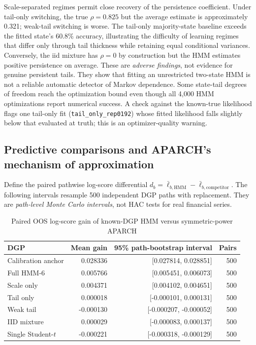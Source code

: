 \documentclass[11pt,a4paper]{article}
\begin{document}
Scale-separated regimes permit close recovery of the persistence coefficient. Under tail-only switching, the true $\rho=0.825$ but the average estimate is approximately 0.321; weak-tail switching is worse. The tail-only majority-state baseline exceeds the fitted state's 60.8\% accuracy, illustrating the difficulty of learning regimes that differ only through tail thickness while retaining equal conditional variances. Conversely, the iid mixture has $\rho=0$ by construction but the HMM estimates positive persistence on average. These are \emph{adverse findings}, not evidence for genuine persistent tails. They show that fitting an unrestricted two-state HMM is not a reliable automatic detector of Markov dependence. Some state-tail degrees of freedom reach the optimization bound even though all 4,000 HMM optimizations report numerical success. A check against the known-true likelihood flags one tail-only fit (\texttt{tail\_only\_rep0192}) whose fitted likelihood falls slightly below that evaluated at truth; this is an optimizer-quality warning.

\subsection{Predictive comparisons and APARCH's mechanism of approximation}
Define the paired pathwise log-score differential $d_b=\bar\ell_{b,\mathrm{HMM}}-\bar\ell_{b,\mathrm{competitor}}$. The following intervals resample 500 independent DGP paths with replacement. They are \emph{path-level Monte Carlo intervals}, not HAC tests for real financial series.
\begin{table}[htbp]\centering\footnotesize
\caption{Paired OOS log-score gain of known-DGP HMM versus symmetric-power APARCH}\label{tab:dgp_paired}
\setlength{\tabcolsep}{5pt}
\begin{tabular}{lrrr}\toprule
DGP & Mean gain & 95\% path-bootstrap interval & Pairs \\\midrule
Calibration anchor & 0.028336 & [0.027814, 0.028851] & 500 \\ 
Full HMM-6 & 0.005766 & [0.005451, 0.006073] & 500 \\ 
Scale only & 0.004371 & [0.004102, 0.004651] & 500 \\ 
Tail only & 0.000018 & [-0.000101, 0.000131] & 500 \\ 
Weak tail & -0.000130 & [-0.000207, -0.000052] & 500 \\ 
IID mixture & 0.000029 & [-0.000083, 0.000137] & 500 \\ 
Single Student-$t$ & -0.000221 & [-0.000318, -0.000129] & 500 \\ 
\bottomrule\end{tabular}
\end{table}
\end{document}

